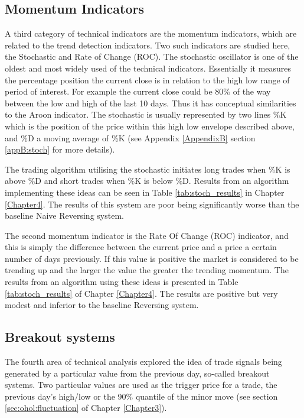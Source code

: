 \subsection{Momentum Indicators}
A third category of technical indicators are the momentum indicators, which are related to the trend detection indicators. Two such indicators are studied here, the Stochastic and Rate of Change (ROC). The stochastic oscillator is one of the oldest and most widely used of the technical indicators. Essentially it measures the percentage position the current close is in relation to the high low range of period of interest. For example the current close could be 80\% of the way between the low and high of the last 10 days. Thus it has conceptual similarities to the Aroon indicator. The stochastic is usually represented by two lines \%K which is the position of the price within this high low envelope described above, and \%D a moving average of \%K (see Appendix \ref{AppendixB} section \ref{appB:stoch} for more details). 

The trading algorithm utilising the stochastic initiates long trades when \%K is above \%D and short trades when \%K is below \%D. Results from an algorithm implementing these ideas can be seen in  Table \ref{tab:stoch_results} in Chapter \ref{Chapter4}. The results of this system are poor being significantly worse than the baseline Naive Reversing system. 


The second momentum indicator is the Rate Of Change (ROC) indicator, and this is simply the difference between the current price and a price a certain number of days previously. If this value is positive the market is considered to be trending up and the larger the value the greater the trending momentum. The results from an algorithm using these ideas is presented in Table \ref{tab:stoch_results} of Chapter \ref{Chapter4}. The results are positive but very modest and inferior to the baseline Reversing system.

\subsection{Breakout systems}
The fourth area of technical analysis explored the idea of trade signals being generated by a particular value from the previous day, so-called breakout systems. Two particular values are used as the trigger price for a trade, the previous day's high/low or the 90\% quantile of the minor move (see section \ref{sec:ohol:fluctuation} of Chapter \ref{Chapter3}). 

